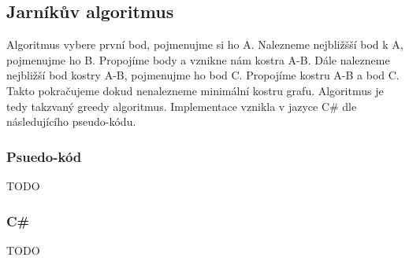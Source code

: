 \documentclass[11pt]{article}
\begin{document}
\subsection{Jarníkův algoritmus}
Algoritmus vybere první bod, pojmenujme si ho A. Nalezneme nejbližšší bod k A, pojmenujme ho B. Propojíme body a vznikne nám kostra A-B. Dále nalezneme nejbližší bod kostry A-B, pojmenujme ho bod C. Propojíme kostru A-B a bod C. Takto pokračujeme dokud nenalezneme minimální kostru grafu.
Algoritmus je tedy takzvaný greedy algoritmus.
Implementace vznikla v jazyce C\# dle následujícího pseudo-kódu.

\subsubsection{Psuedo-kód}
TODO

\subsubsection{C\#}
TODO
\end{document}
